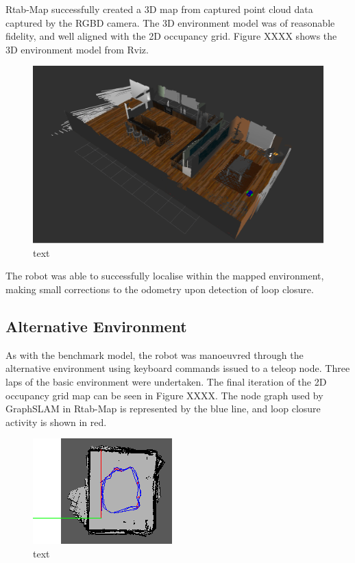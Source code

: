 \documentclass[a4paper]{article}
\begin{document}
Rtab-Map successfully created a 3D map from captured point cloud data captured by the RGBD camera. The 3D environment model was of reasonable fidelity, and well aligned with the 2D occupancy grid. Figure XXXX shows the 3D environment model from Rviz.
\begin{figure}[h]
\centering
\includegraphics[scale=0.28]{kitchen_3d_map_2}
\caption{text}
\end{figure}

The robot was able to successfully localise within the mapped environment, making small corrections to the odometry upon detection of loop closure.


\subsection{Alternative Environment}
As with the benchmark model, the robot was manoeuvred through the alternative environment using keyboard commands issued to a teleop node. Three laps of the basic environment were undertaken. The final iteration of the 2D occupancy grid map can be seen in Figure XXXX. The node graph used by GraphSLAM in Rtab-Map is represented by the blue line, and loop closure activity is shown in red.
\begin{figure}[h]
\centering
\includegraphics[scale=1.2]{slam_house_2_graph_view}
\caption{text}
\end{figure}
\end{document}
